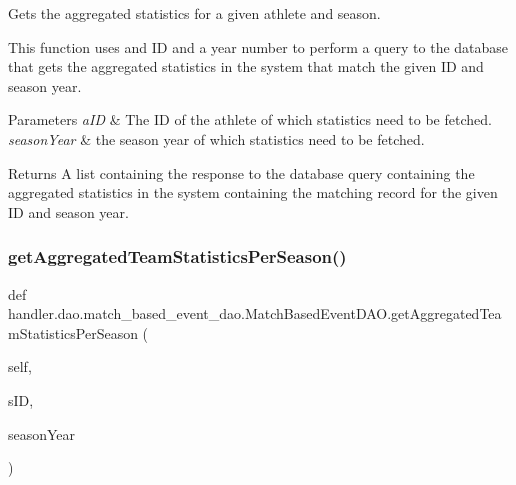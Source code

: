 Gets the aggregated statistics for a given athlete and season. 

This function uses and ID and a year number to perform a query to the database that gets the aggregated statistics in the system that match the given ID and season year.


\begin{DoxyParams}{Parameters}
{\em a\+ID} & The ID of the athlete of which statistics need to be fetched. \\
\hline
{\em season\+Year} & the season year of which statistics need to be fetched.\\
\hline
\end{DoxyParams}
\begin{DoxyReturn}{Returns}
A list containing the response to the database query containing the aggregated statistics in the system containing the matching record for the given ID and season year. 
\end{DoxyReturn}
\mbox{\label{classhandler_1_1dao_1_1match__based__event__dao_1_1_match_based_event_d_a_o_a06abc4420c9f0176e1e61fd914758c70}} 
\subsubsection{\texorpdfstring{get\+Aggregated\+Team\+Statistics\+Per\+Season()}{getAggregatedTeamStatisticsPerSeason()}}
{\footnotesize\ttfamily def handler.\+dao.\+match\+\_\+based\+\_\+event\+\_\+dao.\+Match\+Based\+Event\+D\+A\+O.\+get\+Aggregated\+Team\+Statistics\+Per\+Season (\begin{DoxyParamCaption}\item[{}]{self,  }\item[{}]{s\+ID,  }\item[{}]{season\+Year }\end{DoxyParamCaption})}



